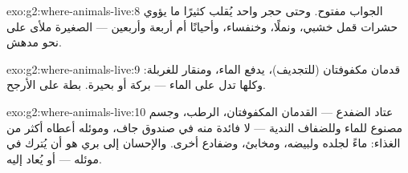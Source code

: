 \begin{solution}{exo:g2:where-animals-live:8}
الجواب مفتوح. وحتى حجر واحد يُقلب كثيرًا ما يؤوي حشرات قمل خشبي،
ونملًا، وخنفساء، وأحيانًا أم أربعة وأربعين ---  الصغيرة
ملأى على نحو مدهش.
\end{solution}

\begin{solution}{exo:g2:where-animals-live:9}
قدمان مكفوفتان (للتجديف)،  يدفع الماء، ومنقار للغربلة: وكلها
تدل على الماء ---  بركة أو بحيرة.  بطة على الأرجح.
\end{solution}

\begin{solution}{exo:g2:where-animals-live:10}
عتاد الضفدع --- القدمان المكفوفتان،  الرطب، وجسم مصنوع
للماء وللضفاف الندية --- لا فائدة منه في صندوق جاف، وموئله أعطاه
أكثر من الغذاء: ماءً لجلده ولبيضه، ومخابئ، وضفادع أخرى. والإحسان
إلى  بري هو أن يُترك في موئله --- أو يُعاد إليه.
\end{solution}
